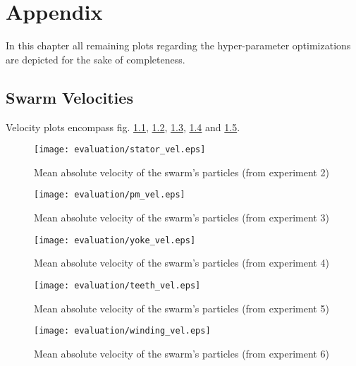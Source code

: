 \chapter{Appendix} 
\label{cha:appendix}

In this chapter all remaining plots regarding the hyper-parameter optimizations are depicted for the sake of completeness.

\section{Swarm Velocities}
\label{app:velocity}
Velocity plots encompass fig. \ref{fig:stator_vel},  \ref{fig:pm_vel},  \ref{fig:yoke_vel},  \ref{fig:teeth_vel} and  \ref{fig:winding_vel}.
\begin{figure}[!hbt]
	\centering
	\texttt{[image: evaluation/stator\_vel.eps]}
	\caption{Mean absolute velocity of the swarm's particles (from experiment 2)}
	\label{fig:stator_vel}
\end{figure}
\begin{figure}[!hbt]
	\centering
	\texttt{[image: evaluation/pm\_vel.eps]}
	\caption{Mean absolute velocity of the swarm's particles (from experiment 3)}
	\label{fig:pm_vel}
\end{figure}
\begin{figure}[!hbt]
	\centering
	\texttt{[image: evaluation/yoke\_vel.eps]}
	\caption{Mean absolute velocity of the swarm's particles (from experiment 4)}
	\label{fig:yoke_vel}
\end{figure}
\begin{figure}[!hbt]
	\centering
	\texttt{[image: evaluation/teeth\_vel.eps]}
	\caption{Mean absolute velocity of the swarm's particles (from experiment 5)}
	\label{fig:teeth_vel}
\end{figure}
\begin{figure}[!hbt]
	\centering
	\texttt{[image: evaluation/winding\_vel.eps]}
	\caption{Mean absolute velocity of the swarm's particles (from experiment 6)}
	\label{fig:winding_vel}
\end{figure}\clearpage

